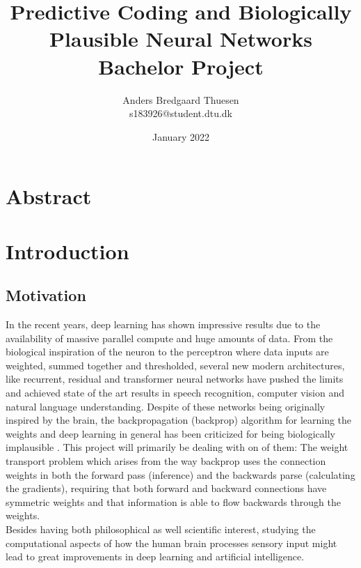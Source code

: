 \documentclass[a4paper,11pt]{article} %
\title{
  Predictive Coding and Biologically Plausible Neural Networks \\
  \large{Bachelor Project}
}
\author{Anders Bredgaard Thuesen \\ s183926@student.dtu.dk}
\date{January 2022}
\begin{document}
\maketitle
\thispagestyle{empty}
\section*{Abstract}

\newpage
\tableofcontents
\thispagestyle{empty}

\newpage

\setcounter{page}{1}

\section{Introduction}
\subsection{Motivation}
In the recent years, deep learning has shown impressive results due to the availability of massive parallel compute and huge amounts of data. From the biological inspiration of the neuron to the perceptron where data inputs are weighted, summed together and thresholded, several new modern architectures, like recurrent, residual and transformer neural networks have pushed the limits and achieved state of the art results in speech recognition, computer vision and natural language understanding. Despite of these networks being originally inspired by the brain, the backpropagation (backprop) algorithm for learning the weights and deep learning in general has been criticized for being biologically implausible \cite{BengioLBL15}. This project will primarily be dealing with on of them: The weight transport problem which arises from the way backprop uses the connection weights in both the forward pass (inference) and the backwards parse (calculating the gradients), requiring that both forward and backward connections have symmetric weights and that information is able to flow backwards through the weights. \\
Besides having both philosophical as well scientific interest, studying the computational aspects of how the human brain processes sensory input might lead to great improvements in deep learning and artificial intelligence.
\end{document}
